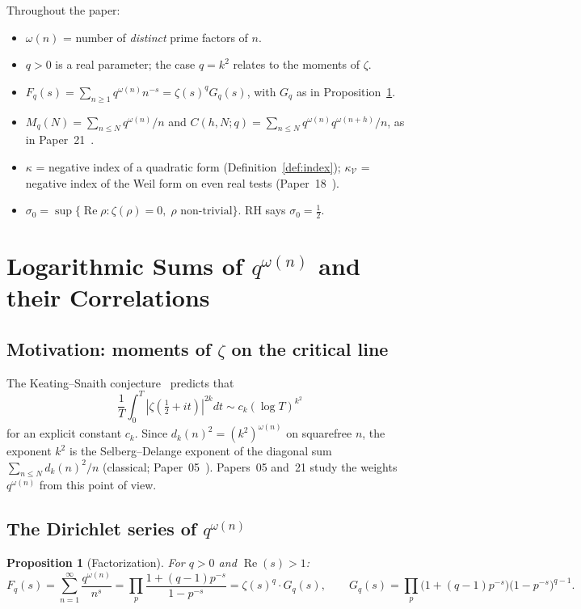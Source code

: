 \documentclass[11pt]{amsart}
\newtheorem{proposition}[theorem]{Proposition}
\theoremstyle{definition}
\theoremstyle{remark}
\renewcommand{\Re}{\operatorname{Re}}
\newcommand{\half}{\tfrac{1}{2}}
\newcommand{\om}{\omega}
\newcommand{\kap}{\kappa}
\newcommand{\sig}{\sigma}
\newcommand{\kV}{\kappa_{\mathcal V}}
\begin{document}
Throughout the paper:
\begin{itemize}
\item $\om(n)$ = number of \emph{distinct} prime factors of $n$.
\item $q>0$ is a real parameter; the case $q=k^2$ relates to the moments of $\zeta$.
\item $F_q(s) = \sum_{n\ge 1} q^{\om(n)} n^{-s} = \zeta(s)^q G_q(s)$, with
  $G_q$ as in Proposition~\ref{prop:factorization}.
\item $M_q(N) = \sum_{n\le N} q^{\om(n)}/n$ and
  $C(h,N;q) = \sum_{n\le N} q^{\om(n)}q^{\om(n+h)}/n$, as in Paper~21~\cite{P21}.
\item $\kap$ = negative index of a quadratic form (Definition~\ref{def:index});
  $\kV$ = negative index of the Weil form on even real tests (Paper~18~\cite{P18}).
\item $\sig_0 = \sup\{\Re\rho : \zeta(\rho)=0,\; \rho \text{ non-trivial}\}$.
  RH says $\sig_0 = \half$.
\end{itemize}

\section{Logarithmic Sums of $q^{\omega(n)}$ and their Correlations}
\label{sec:omega-full}

\subsection{Motivation: moments of $\zeta$ on the critical line}
\label{ss:omega-motivation}

The Keating--Snaith conjecture~\cite{KS00} predicts that
\[
  \frac{1}{T}\int_0^T |\zeta(\half + it)|^{2k} dt \sim c_k (\log T)^{k^2}
\]
for an explicit constant $c_k$. Since $d_k(n)^2=(k^2)^{\om(n)}$ on squarefree $n$, the
exponent $k^2$ is the Selberg--Delange exponent of the diagonal sum
$\sum_{n\le N}d_k(n)^2/n$ (classical; Paper~05~\cite[Thm.~3.2]{P05}). Papers~05 and~21
study the weights $q^{\om(n)}$ from this point of view.

\subsection{The Dirichlet series of $q^{\omega(n)}$}
\label{ss:dirichlet}

\begin{proposition}[Factorization]
\label{prop:factorization}
For $q > 0$ and $\Re(s) > 1$:
\[
  F_q(s) = \sum_{n=1}^\infty \frac{q^{\om(n)}}{n^s}
  = \prod_p \frac{1+(q-1)p^{-s}}{1-p^{-s}}
  = \zeta(s)^q \cdot G_q(s),
  \qquad
  G_q(s) = \prod_p \bigl(1+(q-1)p^{-s}\bigr)\bigl(1-p^{-s}\bigr)^{q-1}.
\]
\end{proposition}
\end{document}
